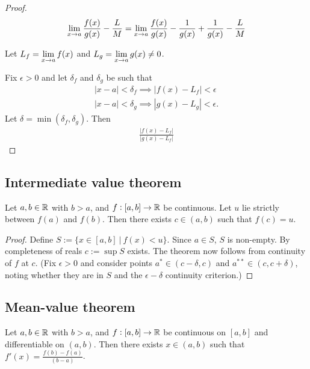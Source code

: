 \begin{proof}
  \begin{align*}
    \lim\limits_{x \to a} \frac{f(x)}{g(x)} - \frac{L}{M}
    = \lim\limits_{x \to a} \frac{f(x)}{g(x)} - \frac{1}{g(x)} + \frac{1}{g(x)} - \frac{L}{M}
  \end{align*}

  Let $L_f = \lim\limits_{x \to a} f(x)$ and $L_g = \lim\limits_{x \to a} g(x) \neq 0$.

  Fix $\epsilon > 0$ and let $\delta_f$ and $\delta_g$ be such that
  \begin{align*}
    |x - a| < \delta_f \implies |f(x) - L_f| < \epsilon\\
    |x - a| < \delta_g \implies |g(x) - L_g| < \epsilon.
  \end{align*}
  Let $\delta = \min(\delta_f, \delta_g)$. Then
  \begin{align*}
    \frac{|f(x) - L_f|}{|g(x) - L_f|}
  \end{align*}
\end{proof}


\subsection{Intermediate value theorem}
\begin{theorem*}
  Let $a, b \in \mathbb{R}$ with $b > a$, and $f:[a,b] \to \mathbb{R}$ be continuous. Let $u$ lie strictly between
  $f(a)$ and $f(b)$. Then there exists $c \in (a, b)$ such that $f(c) = u$.
\end{theorem*}

\begin{proof}
  Define $S := \{x \in [a, b] ~|~ f(x) < u\}$. Since $a \in S$, $S$ is non-empty. By completeness
  of reals $c := \sup S$ exists. The theorem now follows from continuity of $f$ at $c$. (Fix
  $\epsilon > 0$ and consider points $a^* \in (c - \delta, c)$ and $a^{**} \in (c, c + \delta)$,
  noting whether they are in $S$ and the $\epsilon-\delta$ continuity criterion.)
\end{proof}


\subsection{Mean-value theorem}
\begin{theorem*}
  Let $a, b \in \mathbb{R}$ with $b > a$, and $f:[a,b] \to \mathbb{R}$ be continuous on $[a, b]$ and differentiable
  on $(a, b)$. Then there exists $x \in (a, b)$ such that $f'(x) = \frac{f(b) - f(a)}{(b - a)}$.
\end{theorem*}



